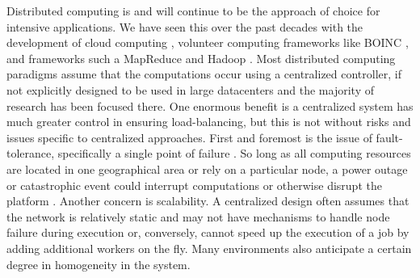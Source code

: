\documentclass[10pt,conference]{IEEEtran}
\begin{document}
Distributed computing is and will continue to be the approach of choice for intensive applications.
We have seen this over the past decades with the development of cloud computing \cite{p2p-cloud}, volunteer computing frameworks like BOINC \cite{shvachko2010hadoop}, and frameworks such a MapReduce\cite{mapreduce} and Hadoop \cite{hadoop}.
Most distributed computing paradigms assume that the computations occur using a centralized controller, if not explicitly designed to be used in large datacenters \cite{hadoopAssumptions} and the majority of research has been focused there.
One enormous benefit is a centralized system has much greater control in ensuring load-balancing, but this is not without risks and issues specific to centralized approaches.
First and foremost is the issue of fault-tolerance, specifically a single point of failure \cite{shvachko2010hadoop}.
So long as all computing resources are located in one geographical area or rely on a particular node, a power outage or catastrophic event could interrupt computations or otherwise disrupt the platform \cite{babaoglu2014people}. Another concern is scalability.  
A centralized design often assumes that the network is relatively static and may not have mechanisms to handle node failure during execution or, conversely, cannot speed up the execution of a job by adding additional workers on the fly.
Many environments also anticipate a certain degree in homogeneity in the system.
\end{document}

